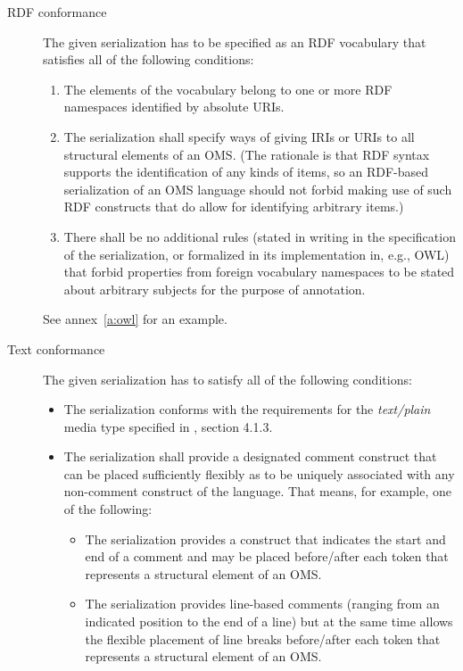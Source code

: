\documentclass[10pt,fleqn,final]{scrreprt}
\makeatletter
\newcommand*{\eg}{e.g.\@\xspace}
\newcommand*\CommentAuthor{}
\renewcommand*\CommentAuthor{#1}}
\newcommand*\CommentDate{}
\renewcommand*\CommentDate{#1}}
\newcommand*\CommentId{}
\renewcommand*\CommentId{#1}}
\newcommand*\CommentType{}
\renewcommand*\CommentType{#1}}
\newcommand*{\SetCommentColorByType}[1]{%
\edef\localType{{#1}}%
\expandafter\ifstrequal\localType{q-aut}{\colorlet{CommentColor}{red}}{%
\expandafter\ifstrequal\localType{q-all}{\colorlet{CommentColor}{orange}}{%
\expandafter\ifstrequal\localType{todo}{\colorlet{CommentColor}{orange}}{%
\expandafter\ifstrequal\localType{fyi}{\colorlet{CommentColor}{lightgray}}{%
\colorlet{CommentColor}{yellow}}}}}}
\newcommand*{\SetCommentPrefixByType}[1]{%
\edef\localType{{#1}}%
\expandafter\@ifmtarg\localType{%
\edef\CommentPrefix{}%
}{%
\caseupper[q]{#1}%
\edef\CommentPrefix{\thestring: }%
}}
\newcommand*{\initComment}[1]{%
\setkeys{Comment}{#1}%
\SetCommentColorByType{\CommentType}%
\relax%
\SetCommentPrefixByType{\CommentType}%
\relax%
}
\newcommand*{\todonote}[2][]{%
\initComment{#1}%
\pdfcomment[author=\CommentAuthor,color=CommentColor,date=\CommentDate,id=\CommentId]{%
\CommentPrefix
#2}}
\renewcommand*{\todonote}[2][]{%
\initComment{#1}%
\ednote{\CommentPrefix #2}}
\newcommand*{\mimetype}[1]{\textit{#1}}
\newcommand{\noterefname}{note}
\newcommand{\nref}[1]{\noterefname~\ref{#1}}
\renewcommand{\nref}[1]{\ref{nref-#1}} %
\providecommand{\DIFadd}[1]{{\protect\color{blue}\uwave{#1}}} %
\providecommand{\DIFaddbegin}{} %
\providecommand{\DIFaddend}{} %
\providecommand{\DIFdelbegin}{} %
\providecommand{\DIFdelend}{} %
\makeatother
\begin{document}
\begin{description}
\item[RDF conformance]
The given serialization has to be specified as an RDF vocabulary that
 satisfies all of the following conditions:
\begin{enumerate}
\item The elements of the vocabulary belong to one or more RDF namespaces
 identified by absolute URIs.
\item\label{it:ids-for-structure} The serialization shall specify ways of giving IRIs or URIs to all structural elements of an OMS. (The  rationale is that RDF syntax supports the identification of any kinds of items, so an RDF-based serialization of an OMS language should not forbid making use of such RDF constructs that do allow for identifying arbitrary items.)
\item There shall be no additional rules (stated in writing in the specification of the serialization, or formalized in its implementation in, e.g., OWL) that forbid properties from foreign vocabulary namespaces to be stated about arbitrary subjects for the purpose of annotation.
\end{enumerate}

See annex~\ref{a:owl} for an example.


\item[Text conformance]
The given serialization has to satisfy all of the following conditions:
\begin{itemize}
\item The serialization conforms with the requirements for the \mimetype{text/plain} media type specified in \DIFdelbegin %
\DIFdelend \DIFaddbegin \DIFadd{\nref{text/plain}}\DIFaddend , section 4.1.3.
\item The serialization shall provide a designated comment construct that can be placed sufficiently flexibly as to be uniquely associated with any non-comment construct of the language.  That means, for example, one of the following:
  \begin{itemize}
  \item The serialization provides a construct that indicates the start and end of a comment and may be placed before/after each token that represents a structural element of an OMS.
  \item The serialization provides line-based comments (ranging from an indicated position to the end of a line) but at the same time allows the flexible placement of line breaks before/after each token that represents a structural element of an OMS.
  \end{itemize}
\end{itemize}


\end{description}
\end{document}
